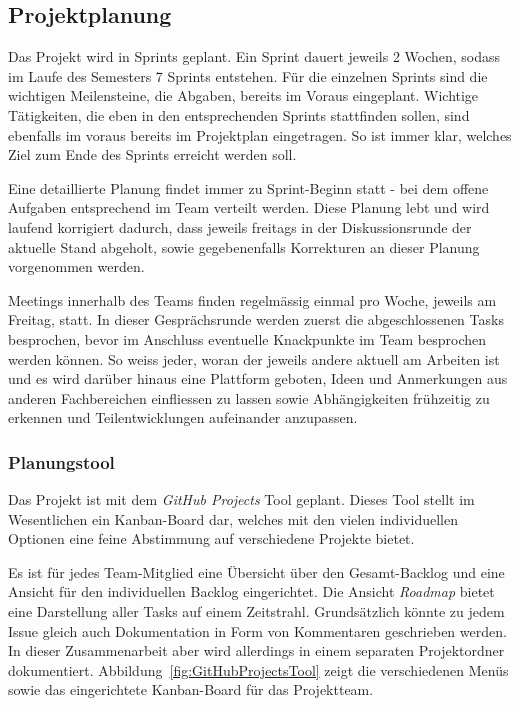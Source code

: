 \documentclass[main.tex]{subfiles} %
\begin{document}

\subsection{Projektplanung}

Das Projekt wird in Sprints geplant. Ein Sprint dauert jeweils 2 Wochen, sodass
im Laufe des Semesters 7 Sprints entstehen. Für die einzelnen Sprints sind die
wichtigen Meilensteine, die Abgaben, bereits im Voraus eingeplant. Wichtige
Tätigkeiten, die eben in den entsprechenden Sprints stattfinden sollen, sind
ebenfalls im voraus bereits im Projektplan eingetragen. So ist immer klar,
welches Ziel zum Ende des Sprints erreicht werden soll.

Eine detaillierte Planung findet immer zu Sprint-Beginn statt - bei dem offene
Aufgaben entsprechend im Team verteilt werden. Diese Planung lebt und wird
laufend korrigiert dadurch, dass jeweils freitags in der Diskussionsrunde der
aktuelle Stand abgeholt, sowie gegebenenfalls Korrekturen an dieser Planung
vorgenommen werden.

Meetings innerhalb des Teams finden regelmässig einmal pro Woche, jeweils am
Freitag, statt. In dieser Gesprächsrunde werden zuerst die abgeschlossenen
Tasks besprochen, bevor im Anschluss eventuelle Knackpunkte im Team besprochen
werden können. So weiss jeder, woran der jeweils andere aktuell am Arbeiten ist
und es wird darüber hinaus eine Plattform geboten, Ideen und Anmerkungen aus
anderen Fachbereichen einfliessen zu lassen sowie Abhängigkeiten frühzeitig zu
erkennen und Teilentwicklungen aufeinander anzupassen.

\subsubsection*{Planungstool}
Das Projekt ist mit dem \textit{GitHub Projects} Tool geplant. Dieses Tool stellt im Wesentlichen
ein Kanban-Board dar, welches mit den vielen individuellen Optionen eine feine
Abstimmung auf verschiedene Projekte bietet.

Es ist für jedes Team-Mitglied eine Übersicht über den Gesamt-Backlog und eine
Ansicht für den individuellen Backlog eingerichtet. Die Ansicht
\textit{Roadmap} bietet eine Darstellung aller Tasks auf einem Zeitstrahl.
Grundsätzlich könnte zu jedem Issue gleich auch Dokumentation in Form von
Kommentaren geschrieben werden. In dieser Zusammenarbeit aber wird allerdings
in einem separaten Projektordner dokumentiert.
Abbildung~\ref{fig:GitHubProjectsTool} zeigt die verschiedenen Menüs sowie das
eingerichtete Kanban-Board für das Projektteam.
\end{document}
